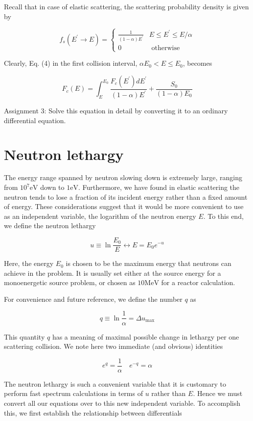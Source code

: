 \documentclass[10pt]{article}
\begin{document}
Recall that in case of elastic scattering, the scattering probability density is given by

$$
f_{s}\left(E^{\prime} \rightarrow E\right)= \begin{cases}\frac{1}{(1-\alpha) E^{\prime}} & E \leq E^{\prime} \leq E / \alpha \\ 0 & \text { otherwise }\end{cases}
$$

Clearly, Eq. (4) in the first collision interval, $\alpha E_{0}<E \leq E_{0}$, becomes

$$
F_{c}(E)=\int_{E}^{E_{0}} \frac{F_{c}\left(E^{\prime}\right) d E^{\prime}}{(1-\alpha) E^{\prime}}+\frac{S_{0}}{(1-\alpha) E_{0}}
$$

Assignment 3: Solve this equation in detail by converting it to an ordinary differential equation.

\section{Neutron lethargy}
The energy range spanned by neutron slowing down is extremely large, ranging from $10^{7} \mathrm{eV}$ down to $1 \mathrm{eV}$. Furthermore, we have found in elastic scattering the neutron tends to lose a fraction of its incident energy rather than a fixed amount of energy. These considerations suggest that it would be more convenient to use as an independent variable, the logarithm of the neutron energy $E$. To this end, we define the neutron lethargy

$$
u \equiv \ln \frac{E_{0}}{E} \longleftrightarrow E=E_{0} e^{-u}
$$

Here, the energy $E_{0}$ is chosen to be the maximum energy that neutrons can achieve in the problem. It is usually set either at the source energy for a monoenergetic source problem, or chosen as $10 \mathrm{MeV}$ for a reactor calculation.

For convenience and future reference, we define the number $q$ as

$$
q \equiv \ln \frac{1}{\alpha}=\Delta u_{\max }
$$

This quantity $q$ has a meaning of maximal possible change in lethargy per one scattering collision. We note here two immediate (and obvious) identities

$$
e^{q}=\frac{1}{\alpha} \quad e^{-q}=\alpha
$$

The neutron lethargy is such a convenient variable that it is customary to perform fast spectrum calculations in terms of $u$ rather than $E$. Hence we must convert all our equations over to this new independent variable. To accomplish this, we first establish the relationship between differentials
\end{document}

